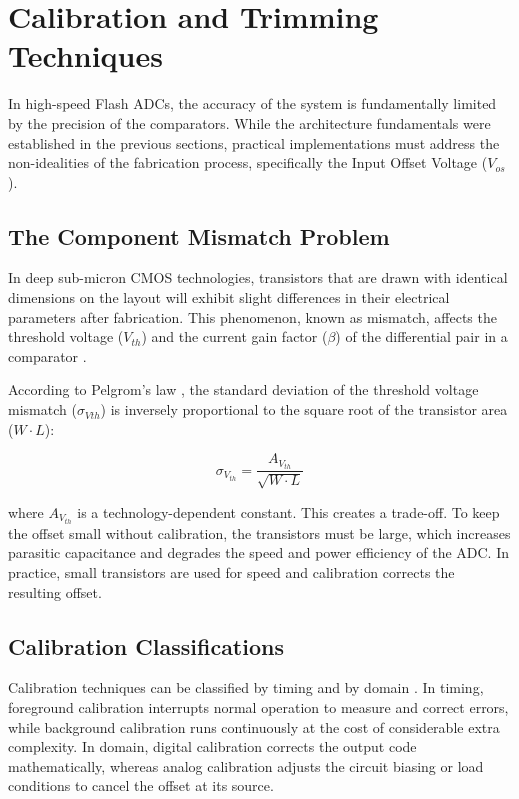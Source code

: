 \section{Calibration and Trimming Techniques} \label{sec:calibration}

In high-speed Flash ADCs, the accuracy of the system is fundamentally limited by the precision of the comparators. While the architecture fundamentals were established in the previous sections, practical implementations must address the non-idealities of the fabrication process, specifically the Input Offset Voltage ($V_{os}$).

\subsection{The Component Mismatch Problem}
In deep sub-micron CMOS technologies, transistors that are drawn with identical dimensions on the layout will exhibit slight differences in their electrical parameters after fabrication. This phenomenon, known as mismatch, affects the threshold voltage ($V_{th}$) and the current gain factor ($\beta$) of the differential pair in a comparator \cite{baker_cmos_2010}.

According to Pelgrom's law \cite{pelgrom_1989}, the standard deviation of the threshold voltage mismatch ($\sigma_{Vth}$) is inversely proportional to the square root of the transistor area ($W \cdot L$):

\begin{equation}
  \sigma_{V_{th}} = \frac{A_{V_{th}}}{\sqrt{W \cdot L}}
\end{equation}

where $A_{V_{th}}$ is a technology-dependent constant. This creates a trade-off. To keep the offset small without calibration, the transistors must be large, which increases parasitic capacitance and degrades the speed and power efficiency of the ADC. In practice, small transistors are used for speed and calibration corrects the resulting offset.

\subsection{Calibration Classifications}
Calibration techniques can be classified by timing and by domain \cite{baker_cmos_2010}. In timing, foreground calibration interrupts normal operation to measure and correct errors, while background calibration runs continuously at the cost of considerable extra complexity. In domain, digital calibration corrects the output code mathematically, whereas analog calibration adjusts the circuit biasing or load conditions to cancel the offset at its source.

